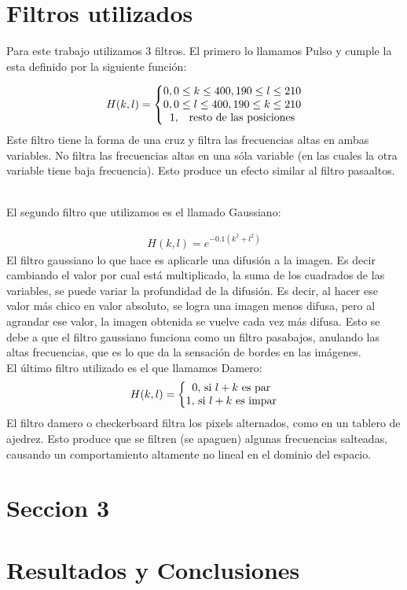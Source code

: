\documentclass[11pt,a4paper]{emulateapj}
\begin{document}
\section{Filtros utilizados}
\label{sec:sec2}
Para este trabajo utilizamos 3 filtros. El primero lo llamamos Pulso y cumple la esta definido por la siguiente función:

\begin{eqnarray}
H(k,l) = \left\{
	\begin{matrix}
		0, 0 \leq k \leq 400, 190 \leq l \leq 210 \\
		0, 0 \leq l \leq 400, 190 \leq k \leq 210 \\
		1, \quad $resto de las posiciones$
	\end{matrix} 
	\right.
\end{eqnarray}
Este filtro tiene la forma de una cruz y filtra las frecuencias altas en ambas variables. No filtra las frecuencias altas en
una sóla variable (en las cuales la otra variable tiene baja frecuencia). Esto produce un efecto similar al filtro
pasaaltos.

\\
El segundo filtro que utilizamos es el llamado Gaussiano:

\begin{eqnarray}
H(k,l) = e^{-0.1(k^2 + l^2)}
\end{eqnarray}
El filtro gaussiano lo que hace es aplicarle una difusión a la imagen. Es decir cambiando el valor por cual está multiplicado, la suma de los cuadrados de las variables, se puede variar la profundidad de la difusión. Es decir, al hacer ese valor más chico en valor absoluto, se logra una imagen menos difusa, pero al agrandar ese valor, la imagen obtenida se vuelve cada vez más difusa. Esto se debe a que el filtro gaussiano funciona como un filtro pasabajos, anulando las altas frecuencias, que es lo que da la sensación de bordes en las imágenes.
\\
El último filtro utilizado es el que llamamos Damero:
\begin{eqnarray}
H(k,l) = \left\{
	\begin{matrix}
		0,$ si $l+k$ es par$\\
		1,$ si $l+k$ es impar$\\
	\end{matrix} 
	\right.
\end{eqnarray}
El filtro damero o checkerboard filtra los pixels alternados, como en un tablero de ajedrez. Esto produce que se 
filtren (se apaguen) algunas frecuencias salteadas, causando un comportamiento altamente no lineal en el dominio
del espacio.


\section{Seccion 3}
\label{sec:sec3}




\section{Resultados y Conclusiones}
\label{sec:resultadosyconclusiones}

%

\end{document}
